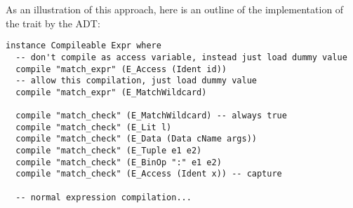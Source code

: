 \documentclass[english,10pt]{article} %
\theoremstyle{definitionstyle}
\theoremstyle{lemmastyle}
\begin{document}
As an illustration of this approach, here is an outline of the implementation of the  trait by the  ADT:
\begin{verbatim}
instance Compileable Expr where
  -- don't compile as access variable, instead just load dummy value
  compile "match_expr" (E_Access (Ident id))
  -- allow this compilation, just load dummy value
  compile "match_expr" (E_MatchWildcard)

  compile "match_check" (E_MatchWildcard) -- always true
  compile "match_check" (E_Lit l)
  compile "match_check" (E_Data (Data cName args))
  compile "match_check" (E_Tuple e1 e2)
  compile "match_check" (E_BinOp ":" e1 e2)
  compile "match_check" (E_Access (Ident x)) -- capture

  -- normal expression compilation...
\end{verbatim}



%
\end{document}
